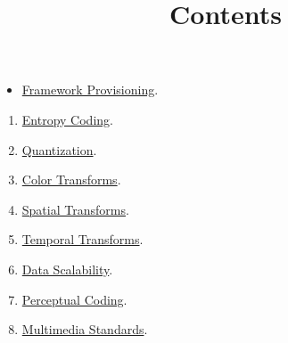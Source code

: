 

\title{\SM{} \newline Contents}

\maketitle

\begin{itemize}
\item \href{https://sistemas-multimedia.github.io/study_guide/contents/provisioning}{Framework Provisioning}.
\end{itemize}
\begin{enumerate}
\item \href{https://sistemas-multimedia.github.io/study_guide/contents/entropy_coding}{Entropy Coding}.
\item \href{https://sistemas-multimedia.github.io/study_guide/contents/quantization}{Quantization}.
\item \href{https://sistemas-multimedia.github.io/study_guide/contents/color_transforms}{Color Transforms}.
\item \href{https://sistemas-multimedia.github.io/study_guide/contents/spatial_transforms}{Spatial Transforms}.
\item \href{https://sistemas-multimedia.github.io/study_guide/contents/temporal_transforms}{Temporal Transforms}.
\item \href{https://sistemas-multimedia.github.io/study_guide/contents/data_scalability}{Data Scalability}.
\item \href{https://sistemas-multimedia.github.io/study_guide/contents/perceptual_coding}{Perceptual Coding}.
\item \href{https://sistemas-multimedia.github.io/study_guide/contents/standards}{Multimedia Standards}.
\end{enumerate}

